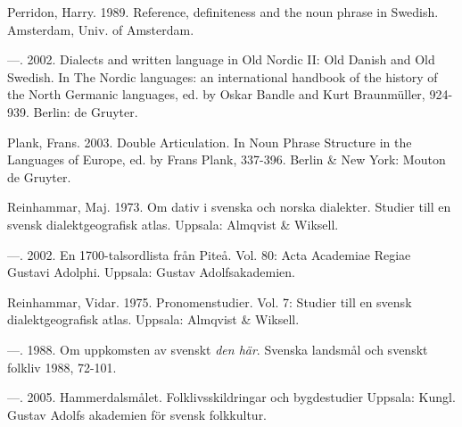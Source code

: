 \begin{styleBodytextC}
Perridon, Harry. 1989. Reference, definiteness and the noun phrase in Swedish. Amsterdam, Univ. of Amsterdam.

\end{styleBodytextC}

\begin{styleBodytextC}
—. 2002. Dialects and written language in Old Nordic II: Old Danish and Old Swedish. In The Nordic languages: an international handbook of the history of the North Germanic languages, ed. by Oskar Bandle and Kurt Braunmüller, 924-939. Berlin: de Gruyter.

\end{styleBodytextC}

\begin{styleBodytextC}
Plank, Frans. 2003. Double Articulation. In Noun Phrase Structure in the Languages of Europe, ed. by Frans Plank, 337-396. Berlin \& New York: Mouton de Gruyter.

\end{styleBodytextC}

\begin{styleBodytextC}
Reinhammar, Maj. 1973. Om dativ i svenska och norska dialekter. Studier till en svensk dialektgeografisk atlas. Uppsala: Almqvist \& Wiksell.

\end{styleBodytextC}

\begin{styleBodytextC}
—. 2002. En 1700-talsordlista från Piteå. Vol. 80: Acta Academiae Regiae Gustavi Adolphi. Uppsala: Gustav Adolfsakademien.

\end{styleBodytextC}

\begin{styleBodytextC}
Reinhammar, Vidar. 1975. Pronomenstudier. Vol. 7: Studier till en svensk dialektgeografisk atlas. Uppsala: Almqvist \& Wiksell.

\end{styleBodytextC}

\begin{styleBodytextC}
—. 1988. Om uppkomsten av svenskt \textit{den här}. Svenska landsmål och svenskt folkliv 1988, 72-101.

\end{styleBodytextC}

\begin{styleBodytextC}
—. 2005. Hammerdalsmålet. Folklivsskildringar och bygdestudier Uppsala: Kungl. Gustav Adolfs akademien för svensk folkkultur.

\end{styleBodytextC}


